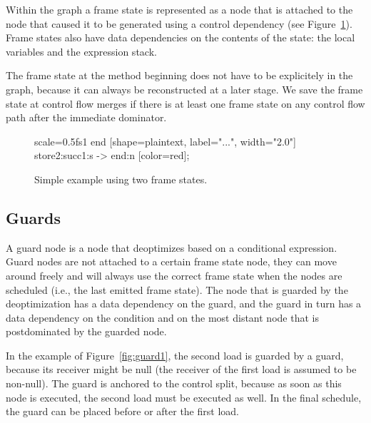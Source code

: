 \documentclass[twocolumn]{svjour3}
\begin{document}
Within the graph a frame state is represented as a node that is attached to the node that caused it to be generated using a control dependency (see Figure~\ref{fig:fs1}).
Frame states also have data dependencies on the contents of the state: the local variables and the expression stack.

The frame state at the method beginning does not have to be explicitely in the graph, because it can always be reconstructed at a later stage.
We save the frame state at control flow merges if there is at least one frame state on any control flow path after the immediate dominator.


\begin{figure}[h]
  \centering
\begin{digraphenv}{scale=0.5}{fs1}
    end [shape=plaintext, label="...", width="2.0"]
    store2:succ1:s -> end:n [color=red];
\end{digraphenv}
  \caption{Simple example using two frame states.}
  \label{fig:fs1}
\end{figure}


\subsection{Guards}
A guard node is a node that deoptimizes based on a conditional expression.
Guard nodes are not attached to a certain frame state node, they can move around freely and will always use the correct frame state when the nodes are scheduled (i.e., the last emitted frame state).
The node that is guarded by the deoptimization has a data dependency on the guard, and the guard in turn has a data dependency on the condition and on the most distant node that is postdominated by the guarded node.

In the example of Figure~\ref{fig:guard1}, the second load is guarded by a guard, because its receiver might be null (the receiver of the first load is assumed to be non-null).
The guard is anchored to the control split, because as soon as this node is executed, the second load must be executed as well.
In the final schedule, the guard can be placed before or after the first load.
\end{document}
